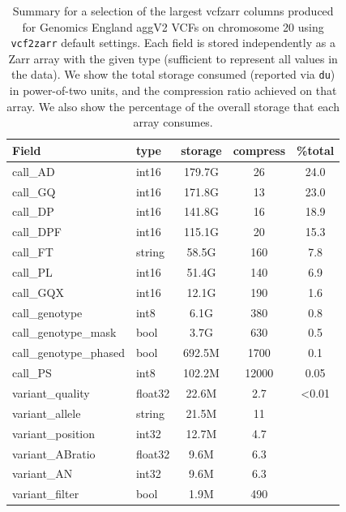\documentclass[a4paper,num-refs]{oup-contemporary}
\begin{document}
\begin{table}
\caption{Summary for a selection of the largest vcfzarr columns produced for 
Genomics England aggV2 VCFs on chromosome 20 using \texttt{vcf2zarr}
default settings. Each field is stored independently 
as a Zarr array with the given type (sufficient to represent all values in the
data). We show the total storage consumed (reported via \texttt{du}) in 
power-of-two units, and the compression ratio achieved on that array.
We also show the percentage of the overall storage that each array consumes.
\label{tab-genomics-england-data}}
\begin{tabular}{llS[table-format=3.1]S[table-format=3.2]S[table-format=3.2]}
\toprule
{Field} & {type} & {storage} & {compress} & {\%total} \\
\midrule
call\_AD &  int16 & 179.7G & 26 & 24.0\\
call\_GQ &  int16 & 171.8G & 13 & 23.0 \\
call\_DP &  int16 & 141.8G & 16 & 18.9 \\
call\_DPF& int16  & 115.1G & 20 & 15.3\\
call\_FT &  string & 58.5G & 160 & 7.8 \\
call\_PL &  int16 & 51.4G & 140 & 6.9 \\
call\_GQX &  int16 & 12.1G & 190 & 1.6 \\
call\_genotype & int8 & 6.1G & 380 & 0.8 \\
call\_genotype\_mask & bool & 3.7G  & 630 & 0.5\\
call\_genotype\_phased & bool & 692.5M  & 1700 & 0.1 \\
call\_PS  & int8  & 102.2M & 12000 & 0.05 \\
variant\_quality & float32 & 22.6M & 2.7 & <0.01 \\
variant\_allele & string & 21.5M & 11 \\
variant\_position & int32 & 12.7M & 4.7 \\
variant\_ABratio & float32 & 9.6M & 6.3 \\
variant\_AN & int32 & 9.6M & 6.3 \\
variant\_filter & bool & 1.9M & 490 \\
\bottomrule
\end{tabular}
\end{table}

\end{document}
